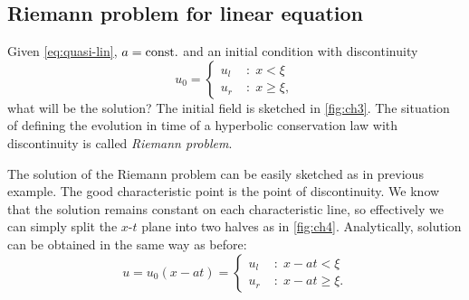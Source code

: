 \documentclass[justified, nobib, a4page]{tufte-handout}
\begin{document}
\subsection{Riemann problem for linear equation}
Given \cref{eq:quasi-lin}, \(a=\mathrm{const.}\) and an initial condition with
discontinuity
\[
	u_0 = \left\{
	\begin{aligned}
		u_l \; & : \; x < \xi     \\
		u_r \; & : \; x \geq \xi,
	\end{aligned} \right.
\]
what will be the solution? The initial field is sketched in \cref{fig:ch3}. The
situation of defining the evolution in time of a hyperbolic conservation law
with discontinuity is called \emph{Riemann problem}.

\begin{marginfigure}
	\begin{center}
	\end{center}
	\caption{Initial field for the Riemann problem example.}\label{fig:ch3}
\end{marginfigure}

The solution of the Riemann problem can be easily sketched as in previous example.
The good characteristic point is the point of discontinuity. We know that the
solution remains constant on each characteristic line, so effectively we can
simply split the \(x\)-\(t\) plane into two halves as in \cref{fig:ch4}.
Analytically, solution can be obtained in the same way as before:
\[
	u = u_0(x-at) =
	\left\{
	\begin{aligned}
		u_l \; & : \; x - at < \xi     \\
		u_r \; & : \; x - at \geq \xi.
	\end{aligned} \right.
\]
\end{document}
